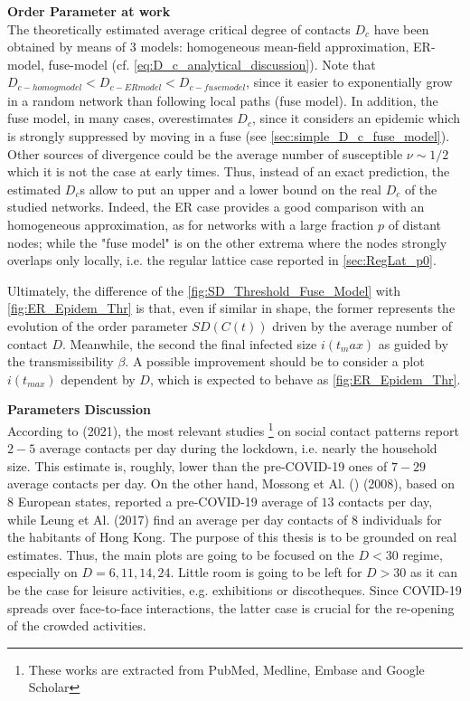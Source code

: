 \documentclass[a4paper,10pt,twoside]{book} %
\theoremstyle{definition}
\begin{document}
\textbf{Order Parameter at work} \\
The theoretically estimated average critical degree of contacts $D_c$ have been obtained by means of 3 models: homogeneous mean-field approximation, ER-model, fuse-model (cf. \autoref{eq:D_c_analytical_discussion}).
Note that $D_{c-homog model} < D_{c-ER model} < D_{c-fuse model}$, since it easier to exponentially grow in a random network than following local paths (fuse model). In addition, the fuse model, in many cases, overestimates $D_c$, since it considers an epidemic which is strongly suppressed by moving in a fuse (see \autoref{sec:simple_D_c_fuse_model}). Other sources of divergence could be the average number of susceptible $ \nu \sim 1/2$ which it is not the case at early times. Thus, instead of an exact prediction, the estimated $ D_c$s allow to put an upper and a lower bound on the real $D_c$ of the studied networks. Indeed, the ER case provides a good comparison with an homogeneous approximation, as for networks with a large fraction $ p$ of distant nodes; while the "fuse model" is on the other extrema where the nodes strongly overlaps only locally, i.e. the regular lattice case reported in \autoref{sec:RegLat_p0}.

Ultimately, the difference of the \autoref{fig:SD_Threshold_Fuse_Model} with \autoref{fig:ER_Epidem_Thr} is that, even if similar in shape, the former represents the evolution of the order parameter $SD(C(t))$ driven by the average number of contact $D$. Meanwhile, the second the final infected size $ i(t_max)$ as guided by the transmissibility $ \beta$. A possible improvement should be to consider a plot $ i(t_{max})$ dependent by $D$, which is expected to behave as \autoref{fig:ER_Epidem_Thr}.

\textbf{Parameters Discussion} \\
According to \cite{Liu::2021_Review_SContactPattern} (2021), the most relevant studies \footnote{These works are extracted from PubMed, Medline, Embase and Google Scholar} on social contact patterns report $2-5$ average contacts per day during the lockdown, i.e. nearly the household size. This estimate is, roughly, lower than the pre-COVID-19 ones of $7-29$ average contacts per day. On the other hand, Mossong et Al. (\cite{Mossong:2008_preCOVID-europe_SCP}) (2008), based on $8$ European states, reported a pre-COVID-19 average of $13$ contacts per day, while Leung et Al. \cite{Leung:2017_HKSocialCP} (2017) find an average per day contacts of $8$ individuals for the habitants of Hong Kong.
The purpose of this thesis is to be grounded on real estimates. Thus, the main plots are going to be focused on the $D < 30$ regime, especially on $ D = 6,11,14,24$. Little room is going to be left for $D > 30$ as it can be the case for leisure activities, e.g. exhibitions or discotheques. Since COVID-19 spreads over face-to-face interactions, the latter case is crucial for the re-opening of the crowded activities.
\end{document}
